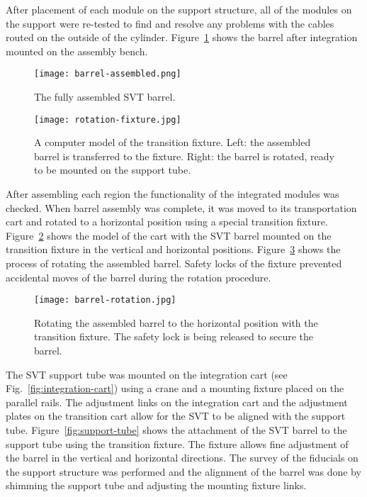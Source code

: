 After placement of each module on the support structure, all of the modules on the support were re-tested to find
and resolve any problems with the cables routed on the outside of the cylinder. Figure~\ref{fig:barrel-assembled}
shows the barrel after integration mounted on the assembly bench.

\begin{figure}[h] 
\centering 
\texttt{[image: barrel-assembled.png]}
\caption{The fully assembled SVT barrel.}
\label{fig:barrel-assembled}
\end{figure}

\begin{figure}[h] 
\centering 
\texttt{[image: rotation-fixture.jpg]}
\caption{A computer model of the transition fixture. Left: the assembled barrel is transferred to the fixture.
  Right: the barrel is rotated, ready to be mounted on the support tube.}
\label{fig:rotation-fixture}
\end{figure}

After assembling each region the functionality of the integrated modules was checked. When barrel assembly was
complete, it was moved to its transportation cart and rotated to a horizontal position using a special transition
fixture. Figure~\ref{fig:rotation-fixture} shows the model of the cart with the SVT barrel mounted on the transition
fixture in the vertical and horizontal positions. Figure~\ref{fig:barrel-rotation} shows the process of rotating the
assembled barrel. Safety locks of the fixture prevented accidental moves of the barrel during the rotation
procedure.

\begin{figure}[h] 
\centering 
\texttt{[image: barrel-rotation.jpg]}
\caption{Rotating the assembled barrel to the horizontal position with the transition fixture. The safety lock is
  being released to secure the barrel.}
\label{fig:barrel-rotation}
\end{figure}

The SVT support tube was mounted on the integration cart (see Fig.~\ref{fig:integration-cart}) using a crane and
a mounting fixture placed on the parallel rails. The adjustment links on the integration cart and the adjustment
plates on the transition cart allow for the SVT to be aligned with the support tube. Figure~\ref{fig:support-tube}
shows the attachment of the SVT barrel to the support tube using the transition fixture. The fixture allows fine
adjustment of the barrel in the vertical and horizontal directions. The survey of the fiducials on the support
structure was performed and the alignment of the barrel was done by shimming the support tube and adjusting the
mounting fixture links. 

